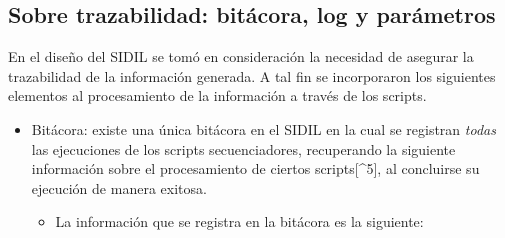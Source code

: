 \documentclass[
]{article}
\begin{document}
\hypertarget{trazabilidad}{%
\subsection{Sobre trazabilidad: bitácora, log y parámetros}\label{trazabilidad}}

En el diseño del SIDIL se tomó en consideración la necesidad de asegurar la trazabilidad de la información generada. A tal fin se incorporaron los siguientes elementos al procesamiento de la información a través de los scripts.

\begin{itemize}
\item
  Bitácora: existe una única bitácora en el SIDIL en la cual se registran \emph{todas} las ejecuciones de los scripts secuenciadores, recuperando la siguiente información sobre el procesamiento de ciertos scripts{[}\^{}5{]}, al concluirse su ejecución de manera exitosa.

  \begin{itemize}
  \item
    La información que se registra en la bitácora es la siguiente:


\end{itemize}
\end{itemize}
\end{document}

